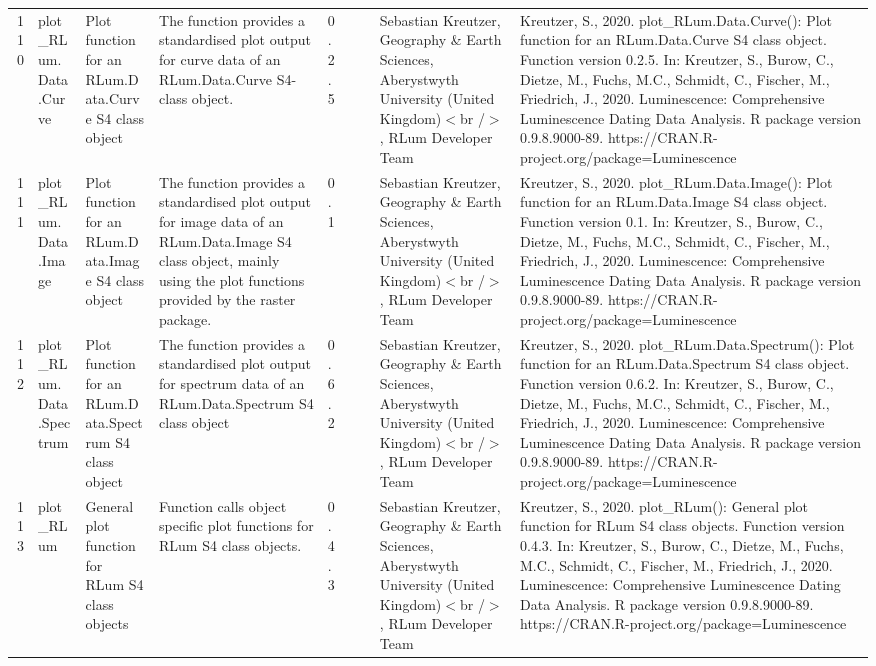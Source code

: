 \begin{table}[ht]
\begin{tabular}{rllllllll}
 \\ 
  110 & plot\_RLum.Data.Curve & Plot function for an RLum.Data.Curve S4 class object & The function provides a standardised plot output for curve data of an RLum.Data.Curve  S4-class object. & 0.2.5
 &  &  & Sebastian Kreutzer, Geography \& Earth Sciences, Aberystwyth University (United Kingdom)$<$br /$>$ , RLum Developer Team & Kreutzer, S., 2020. plot\_RLum.Data.Curve(): Plot function for an RLum.Data.Curve S4 class object. Function version 0.2.5. In: Kreutzer, S., Burow, C., Dietze, M., Fuchs, M.C., Schmidt, C., Fischer, M., Friedrich, J., 2020. Luminescence: Comprehensive Luminescence Dating Data Analysis. R package version 0.9.8.9000-89. https://CRAN.R-project.org/package=Luminescence
 \\ 
  111 & plot\_RLum.Data.Image & Plot function for an  RLum.Data.Image  S4 class object & The function provides a standardised plot output for image data of an RLum.Data.Image S4 class object, mainly using the plot functions provided by the  raster  package. & 0.1
 &  &  & Sebastian Kreutzer, Geography \& Earth Sciences, Aberystwyth University (United Kingdom)$<$br /$>$ , RLum Developer Team & Kreutzer, S., 2020. plot\_RLum.Data.Image(): Plot function for an RLum.Data.Image S4 class object. Function version 0.1. In: Kreutzer, S., Burow, C., Dietze, M., Fuchs, M.C., Schmidt, C., Fischer, M., Friedrich, J., 2020. Luminescence: Comprehensive Luminescence Dating Data Analysis. R package version 0.9.8.9000-89. https://CRAN.R-project.org/package=Luminescence
 \\ 
  112 & plot\_RLum.Data.Spectrum & Plot function for an RLum.Data.Spectrum S4 class object & The function provides a standardised plot output for spectrum data of an RLum.Data.Spectrum S4 class object & 0.6.2
 &  &  & Sebastian Kreutzer, Geography \& Earth Sciences, Aberystwyth University (United Kingdom)$<$br /$>$ , RLum Developer Team & Kreutzer, S., 2020. plot\_RLum.Data.Spectrum(): Plot function for an RLum.Data.Spectrum S4 class object. Function version 0.6.2. In: Kreutzer, S., Burow, C., Dietze, M., Fuchs, M.C., Schmidt, C., Fischer, M., Friedrich, J., 2020. Luminescence: Comprehensive Luminescence Dating Data Analysis. R package version 0.9.8.9000-89. https://CRAN.R-project.org/package=Luminescence
 \\ 
  113 & plot\_RLum & General plot function for RLum S4 class objects & Function calls object specific plot functions for RLum S4 class objects. & 0.4.3
 &  &  & Sebastian Kreutzer, Geography \& Earth Sciences, Aberystwyth University (United Kingdom)$<$br /$>$ , RLum Developer Team & Kreutzer, S., 2020. plot\_RLum(): General plot function for RLum S4 class objects. Function version 0.4.3. In: Kreutzer, S., Burow, C., Dietze, M., Fuchs, M.C., Schmidt, C., Fischer, M., Friedrich, J., 2020. Luminescence: Comprehensive Luminescence Dating Data Analysis. R package version 0.9.8.9000-89. https://CRAN.R-project.org/package=Luminescence

\end{tabular}
\end{table}
